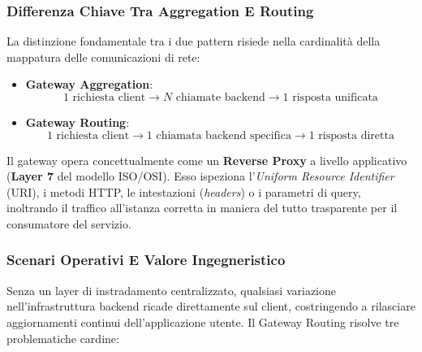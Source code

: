\documentclass[11pt, a4paper]{article}
\begin{document}
\subsubsection{Differenza Chiave Tra Aggregation E Routing}

La distinzione fondamentale tra i due pattern risiede nella cardinalità della mappatura delle comunicazioni di rete:
\begin{itemize}[noitemsep]
    \item \textbf{Gateway Aggregation}:
    \[
        1 \text{ richiesta client} \longrightarrow N \text{ chiamate backend} \longrightarrow 1 \text{ risposta unificata}
    \]
    \item \textbf{Gateway Routing}:
    \[
        1 \text{ richiesta client} \longrightarrow 1 \text{ chiamata backend specifica} \longrightarrow 1 \text{ risposta diretta}
    \]
\end{itemize}

Il gateway opera concettualmente come un \textbf{Reverse Proxy} a livello applicativo (\textbf{Layer 7} del modello ISO/OSI). Esso ispeziona l'\emph{Uniform Resource Identifier} (URI), i metodi HTTP, le intestazioni (\emph{headers}) o i parametri di query, inoltrando il traffico all'istanza corretta in maniera del tutto trasparente per il consumatore del servizio.

\subsubsection{Scenari Operativi E Valore Ingegneristico}

Senza un layer di instradamento centralizzato, qualsiasi variazione nell'infrastruttura backend ricade direttamente sul client, costringendo a rilasciare aggiornamenti continui dell'applicazione utente. Il Gateway Routing risolve tre problematiche cardine:
\end{document}
